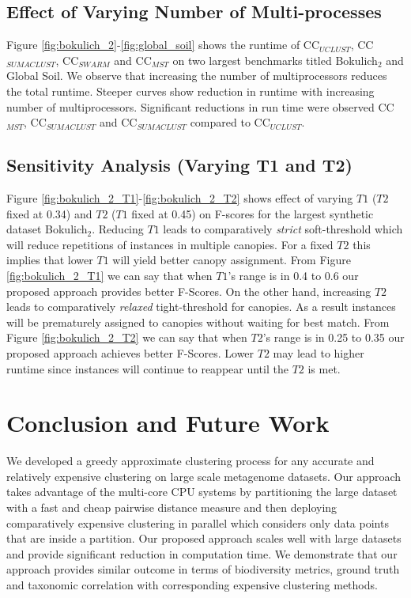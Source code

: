 \documentclass[10pt, conference, compsocconf]{IEEEtran}
\begin{document}
\subsection{\textbf{Effect of Varying Number of Multi-processes}}
Figure \ref{fig:bokulich_2}-\ref{fig:global_soil} shows the runtime of CC$_{UCLUST}$, CC$_{SUMACLUST}$, CC$_{SWARM}$ and CC$_{MST}$ on two largest benchmarks titled Bokulich$_2$ and Global Soil. We observe that increasing the number of multiprocessors reduces the total runtime. Steeper curves show reduction in runtime with increasing number of multiprocessors. Significant reductions in run time were observed CC$_{MST}$, CC$_{SUMACLUST}$ and CC$_{SUMACLUST}$ compared to CC$_{UCLUST}$.   

\subsection{\textbf{Sensitivity Analysis (Varying T1 and T2)}}
Figure \ref{fig:bokulich_2_T1}-\ref{fig:bokulich_2_T2} shows effect of varying $T1$ ($T2$ fixed at 0.34) and $T2$ ($T1$ fixed at 0.45) on F-scores for the largest synthetic dataset Bokulich$_2$. Reducing $T1$ leads to comparatively \textit{strict} soft-threshold which will reduce repetitions of instances in multiple canopies. For a fixed $T2$ this implies that lower $T1$ will yield better canopy assignment. From Figure \ref{fig:bokulich_2_T1} we can say that when $T1$'s range is in 0.4 to 0.6 our proposed approach provides better F-Scores. On the other hand, increasing $T2$ leads to comparatively \textit{relaxed} tight-threshold for canopies. As a result instances will be prematurely assigned to canopies without waiting for best match. From Figure \ref{fig:bokulich_2_T2} we can say that when $T2$'s range  is in 0.25 to 0.35 our proposed approach achieves better F-Scores. Lower $T2$ may lead to higher runtime since instances will continue to reappear until the $T2$ is met.                   


\section{Conclusion and Future Work}
\label{sec:Conclusion}

We developed a greedy approximate clustering process for any accurate and relatively expensive clustering on large scale metagenome datasets. Our approach takes advantage of the multi-core CPU systems by partitioning the large dataset with a fast and cheap pairwise distance measure and then deploying comparatively expensive clustering in parallel which considers only data points that are inside a partition. Our proposed approach scales well with large datasets and provide significant reduction in computation time. We demonstrate that our approach provides similar outcome in terms of biodiversity metrics, ground truth and taxonomic correlation with corresponding expensive clustering methods.





\end{document}
